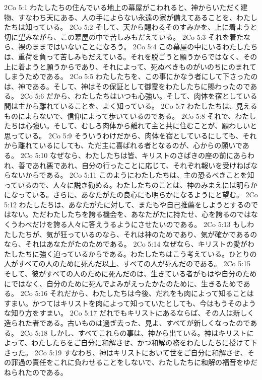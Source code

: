2Co 5:1  わたしたちの住んでいる地上の幕屋がこわれると、神からいただく建物、すなわち天にある、人の手によらない永遠の家が備えてあることを、わたしたちは知っている。
2Co 5:2  そして、天から賜わるそのすみかを、上に着ようと切に望みながら、この幕屋の中で苦しみもだえている。
2Co 5:3  それを着たなら、裸のままではいないことになろう。
2Co 5:4  この幕屋の中にいるわたしたちは、重荷を負って苦しみもだえている。それを脱ごうと願うからではなく、その上に着ようと願うからであり、それによって、死ぬべきものがいのちにのまれてしまうためである。
2Co 5:5  わたしたちを、この事にかなう者にして下さったのは、神である。そして、神はその保証として御霊をわたしたちに賜わったのである。
2Co 5:6  だから、わたしたちはいつも心強い。そして、肉体を宿としている間は主から離れていることを、よく知っている。
2Co 5:7  わたしたちは、見えるものによらないで、信仰によって歩いているのである。
2Co 5:8  それで、わたしたちは心強い。そして、むしろ肉体から離れて主と共に住むことが、願わしいと思っている。
2Co 5:9  そういうわけだから、肉体を宿としているにしても、それから離れているにしても、ただ主に喜ばれる者となるのが、心からの願いである。
2Co 5:10  なぜなら、わたしたちは皆、キリストのさばきの座の前にあらわれ、善であれ悪であれ、自分の行ったことに応じて、それぞれ報いを受けねばならないからである。
2Co 5:11  このようにわたしたちは、主の恐るべきことを知っているので、人々に説き勧める。わたしたちのことは、神のみまえには明らかになっている。さらに、あなたがたの良心にも明らかになるようにと望む。
2Co 5:12  わたしたちは、あなたがたに対して、またもや自己推薦をしようとするのではない。ただわたしたちを誇る機会を、あなたがたに持たせ、心を誇るのではなくうわべだけを誇る人々に答えうるようにさせたいのである。
2Co 5:13  もしわたしたちが、気が狂っているのなら、それは神のためであり、気が確かであるのなら、それはあなたがたのためである。
2Co 5:14  なぜなら、キリストの愛がわたしたちに強く迫っているからである。わたしたちはこう考えている。ひとりの人がすべての人のために死んだ以上、すべての人が死んだのである。
2Co 5:15  そして、彼がすべての人のために死んだのは、生きている者がもはや自分のためにではなく、自分のために死んでよみがえったかたのために、生きるためである。
2Co 5:16  それだから、わたしたちは今後、だれをも肉によって知ることはすまい。かつてはキリストを肉によって知っていたとしても、今はもうそのような知り方をすまい。
2Co 5:17  だれでもキリストにあるならば、その人は新しく造られた者である。古いものは過ぎ去った、見よ、すべてが新しくなったのである。
2Co 5:18  しかし、すべてこれらの事は、神から出ている。神はキリストによって、わたしたちをご自分に和解させ、かつ和解の務をわたしたちに授けて下さった。
2Co 5:19  すなわち、神はキリストにおいて世をご自分に和解させ、その罪過の責任をこれに負わせることをしないで、わたしたちに和解の福音をゆだねられたのである。

